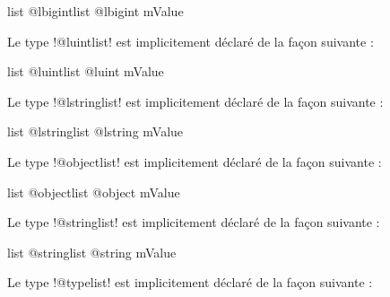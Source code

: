 \begin{galgas3box}
list @lbigintlist {
  @lbigint mValue
}
\end{galgas3box}











Le type \ggst!@luintlist! est implicitement déclaré de la façon suivante :

\begin{galgas3box}
list @luintlist {
  @luint mValue
}
\end{galgas3box}











Le type \ggst!@lstringlist! est implicitement déclaré de la façon suivante :

\begin{galgas3box}
list @lstringlist {
  @lstring mValue
}
\end{galgas3box}








Le type \ggst!@objectlist! est implicitement déclaré de la façon suivante :

\begin{galgas3box}
list @objectlist {
  @object mValue
}
\end{galgas3box}






Le type \ggst!@stringlist! est implicitement déclaré de la façon suivante :

\begin{galgas3box}
list @stringlist {
  @string mValue
}
\end{galgas3box}








Le type \ggst!@typelist! est implicitement déclaré de la façon suivante :

